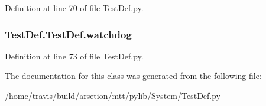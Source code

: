Definition at line 70 of file Test\-Def.\-py.

\hypertarget{classTestDef_1_1TestDef_a40da46aa95507cffa798cb152fa69e27}{
\subsubsection[{watchdog}]{\setlength{\rightskip}{0pt plus 5cm}Test\-Def.\-Test\-Def.\-watchdog}}\label{classTestDef_1_1TestDef_a40da46aa95507cffa798cb152fa69e27}


Definition at line 73 of file Test\-Def.\-py.



The documentation for this class was generated from the following file\-:\begin{DoxyCompactItemize}
\item 
/home/travis/build/arsetion/mtt/pylib/\-System/\hyperlink{TestDef_8py}{Test\-Def.\-py}\end{DoxyCompactItemize}
